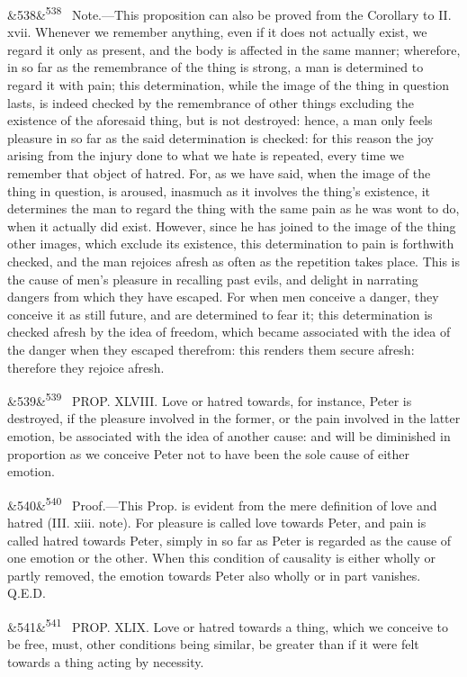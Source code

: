 \documentclass[12pt]{article}
\newcommand{\para}[1][]{\par\noindent\ifx&#1&\else\textsuperscript{\footnotesize #1}~\fi}
\begin{document}
\para[538] Note.---This proposition can also be proved from the Corollary to II. xvii. Whenever we remember anything, even if it does not actually exist, we regard it only as present, and the body is affected in the same manner; wherefore, in so far as the remembrance of the thing is strong, a man is determined to regard it with pain; this determination, while the image of the thing in question lasts, is indeed checked by the remembrance of other things excluding the existence of the aforesaid thing, but is not destroyed: hence, a man only feels pleasure in so far as the said determination is checked: for this reason the joy arising from the injury done to what we hate is repeated, every time we remember that object of hatred. For, as we have said, when the image of the thing in question, is aroused, inasmuch as it involves the thing's existence, it determines the man to regard the thing with the same pain as he was wont to do, when it actually did exist. However, since he has joined to the image of the thing other images, which exclude its existence, this determination to pain is forthwith checked, and the man rejoices afresh as often as the repetition takes place. This is the cause of men's pleasure in recalling past evils, and delight in narrating dangers from which they have escaped. For when men conceive a danger, they conceive it as still future, and are determined to fear it; this determination is checked afresh by the idea of freedom, which became associated with the idea of the danger when they escaped therefrom: this renders them secure afresh: therefore they rejoice afresh.

\para[539] PROP. XLVIII. Love or hatred towards, for instance, Peter is destroyed, if the pleasure involved in the former, or the pain involved in the latter emotion, be associated with the idea of another cause: and will be diminished in proportion as we conceive Peter not to have been the sole cause of either emotion.

\para[540] Proof.---This Prop. is evident from the mere definition of love and hatred (III. xiii. note). For pleasure is called love towards Peter, and pain is called hatred towards Peter, simply in so far as Peter is regarded as the cause of one emotion or the other. When this condition of causality is either wholly or partly removed, the emotion towards Peter also wholly or in part vanishes. Q.E.D.

\para[541] PROP. XLIX. Love or hatred towards a thing, which we conceive to be free, must, other conditions being similar, be greater than if it were felt towards a thing acting by necessity.
\end{document}
